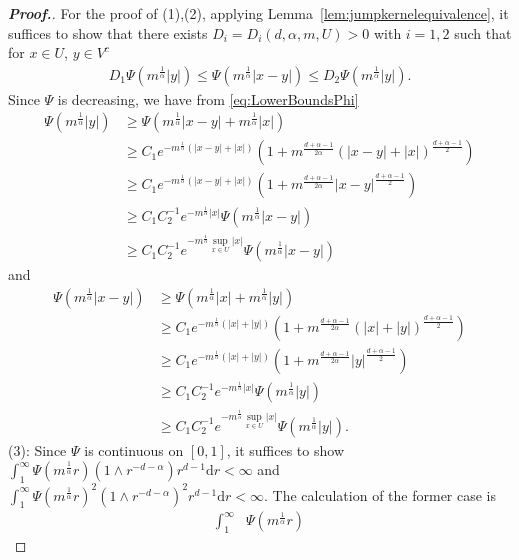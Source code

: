 \documentclass[10pt,a4paper]{amsart}
\renewcommand{\d}{\mathrm{d}}
\begin{document}
\begin{proof}[{\bf Proof.}]
For the proof of (1),(2), 
applying Lemma~\ref{lem:jumpkernelequivalence}, it suffices to show that there exists $D_i=D_i(d,\alpha,m,U)>0$ with $i=1,2$ such that for $x\in U$, $y\in V^c$ 
\begin{align*}
D_1\Psi(m^{\frac{1}{\alpha}}|y|)\leq \Psi(m^{\frac{1}{\alpha}}|x-y|)\leq D_2\Psi(m^{\frac{1}{\alpha}}|y|).
\end{align*}
Since $\Psi$ is decreasing, we have from \eqref{eq:LowerBoundsPhi}
\begin{align*}
\Psi(m^{\frac{1}{\alpha}}|y|)&\geq 
\Psi(m^{\frac{1}{\alpha}}|x-y|+m^{\frac{1}{\alpha}}|x|)\\
&\geq C_1e^{-m^{\frac{1}{\alpha}}(|x-y|+|x|)}\left(1+m^{\frac{d+\alpha-1}{2\alpha}}(|x-y|+|x|)^{\frac{d+\alpha-1}{2}} \right)\\
&\geq C_1e^{-m^{\frac{1}{\alpha}}(|x-y|+|x|)}\left(1+m^{\frac{d+\alpha-1}{2\alpha}}|x-y|^{\frac{d+\alpha-1}{2}} \right)\\
&\geq C_1C_2^{-1}e^{-m^{\frac{1}{\alpha}}|x|}\Psi(m^{\frac{1}{\alpha}}|x-y|)\\
&\geq C_1C_2^{-1}e^{-m^{\frac{1}{\alpha}}\sup_{x\in U}|x|}\Psi(m^{\frac{1}{\alpha}}|x-y|)
\end{align*}
and 
\begin{align*}
\Psi(m^{\frac{1}{\alpha}}|x-y|)&\geq \Psi(m^{\frac{1}{\alpha}}|x|+m^{\frac{1}{\alpha}}|y|)\\
&\geq C_1e^{-m^{\frac{1}{\alpha}}(|x|+|y|)}\left(1+m^{\frac{d+\alpha-1}{2\alpha}}(|x|+|y|)^{\frac{d+\alpha-1}{2}} \right)\\
&\geq C_1e^{-m^{\frac{1}{\alpha}}(|x|+|y|)}\left(1+m^{\frac{d+\alpha-1}{2\alpha}}|y|^{\frac{d+\alpha-1}{2}} \right)\\
&\geq C_1C_2^{-1}e^{-m^{\frac{1}{\alpha}}|x|}\Psi(m^{\frac{1}{\alpha}}|y|)
\\
&\geq C_1C_2^{-1}e^{-m^{\frac{1}{\alpha}}\sup_{x\in U}|x|}\Psi(m^{\frac{1}{\alpha}}|y|).
\end{align*}
(3): Since $\Psi$ is continuous on $[0,1]$, 
it suffices to show $\int_1^{\infty}\Psi(m^{\frac{1}{\alpha}}r)
\left(1\land r^{-d-\alpha} \right)r^{d-1}{\d} r<\infty$ and 
$\int_1^{\infty}\Psi(m^{\frac{1}{\alpha}}r)^2
\left(1\land r^{-d-\alpha} \right)^2r^{d-1}{\d} r<\infty$. 
The calculation of the former case is 
\begin{align*}
\int_1^{\infty}&\Psi(m^{\frac{1}{\alpha}}r)

\end{align*}
\end{proof}
\end{document}
